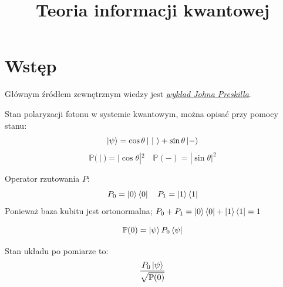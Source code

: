 \documentclass{../notatki}
\title{Teoria informacji kwantowej}
\begin{document}
\section{Wstęp}

Głównym źródłem zewnętrznym wiedzy jest
\textit{\href{https://www.preskill.caltech.edu/ph219/chap10_6A_2025.pdf}{wykład
Johna Preskilla}}.

Stan polaryzacji fotonu w systemie kwantowym, można opisać przy pomocy stanu:
$$
\ket{\psi} = \cos \theta \ket{\ |\ } + \sin \theta \ket{-}
$$
$$
\mathbb{P}(\ |\ ) = |\cos \theta|^2 \quad \mathbb{P}( - ) = |\sin \theta|^2
$$

Operator rzutowania $P$:
$$
P_0 = \ket{0}\bra{0} \quad P_1 = \ket{1}\bra{1}
$$
Ponieważ baza kubitu jest ortonormalna; $P_0 + P_1 = \ket{0}\bra{0} +
\ket{1}\bra{1} = 1$

$$
\mathbb{P}(0) = \ket{\psi} P_0 \bra{\psi}
$$

Stan układu po pomiarze to:
$$
\frac{P_0 \ket{\psi}}{\sqrt{\mathbb{P}(0)}}
$$
\end{document}
